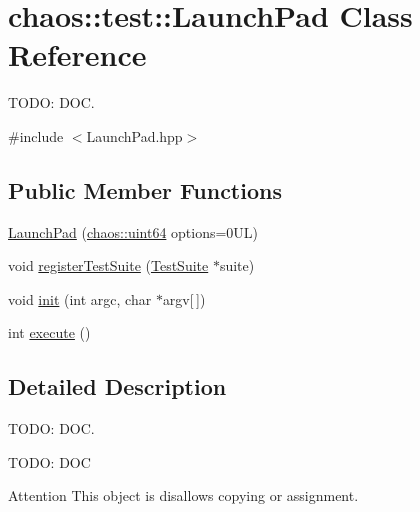 \hypertarget{classchaos_1_1test_1_1_launch_pad}{\section{chaos\-:\-:test\-:\-:Launch\-Pad Class Reference}
\label{classchaos_1_1test_1_1_launch_pad}
}


T\-O\-D\-O\-: D\-O\-C.  




{\ttfamily \#include $<$Launch\-Pad.\-hpp$>$}

\subsection*{Public Member Functions}
\begin{DoxyCompactItemize}
\item 
\hyperlink{classchaos_1_1test_1_1_launch_pad_aefa41b649cbe72a3922ece910216a9ff}{Launch\-Pad} (\hyperlink{namespacechaos_a34fe5f5bfc3ef6d80b5d094ed91b4d6e}{chaos\-::uint64} options=0\-U\-L)
\item 
void \hyperlink{classchaos_1_1test_1_1_launch_pad_aa1d283bca075fca020ba21fa2b1b3b34}{register\-Test\-Suite} (\hyperlink{classchaos_1_1test_1_1_test_suite}{Test\-Suite} $\ast$suite)
\item 
void \hyperlink{classchaos_1_1test_1_1_launch_pad_a88d5fc05d7275813e1f61bb5a90ff6ee}{init} (int argc, char $\ast$argv\mbox{[}$\,$\mbox{]})
\item 
int \hyperlink{classchaos_1_1test_1_1_launch_pad_af337fda27dab02981153a14192ab4471}{execute} ()
\end{DoxyCompactItemize}


\subsection{Detailed Description}
T\-O\-D\-O\-: D\-O\-C. 

T\-O\-D\-O\-: D\-O\-C

\begin{DoxyAttention}{Attention}
This object is disallows copying or assignment. 
\end{DoxyAttention}


